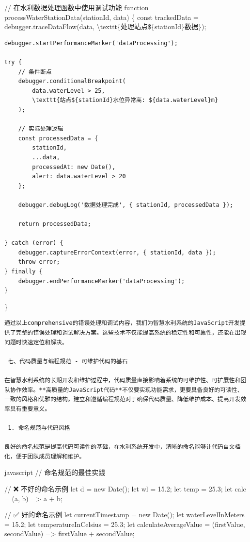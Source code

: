 {{// 在水利数据处理函数中使用调试功能 function processWaterStationData(stationId, data) \{ const trackedData = debugger.traceDataFlow(data, \textbackslash texttt\{处理站点\$\{stationId\}数据\});

\begin{verbatim}
debugger.startPerformanceMarker('dataProcessing');

try {
    // 条件断点
    debugger.conditionalBreakpoint(
        data.waterLevel > 25, 
        \texttt{站点${stationId}水位异常高: ${data.waterLevel}m}
    );
    
    // 实际处理逻辑
    const processedData = {
        stationId,
        ...data,
        processedAt: new Date(),
        alert: data.waterLevel > 20
    };
    
    debugger.debugLog('数据处理完成', { stationId, processedData });
    
    return processedData;
    
} catch (error) {
    debugger.captureErrorContext(error, { stationId, data });
    throw error;
} finally {
    debugger.endPerformanceMarker('dataProcessing');
}
\end{verbatim}

\}

\begin{lstlisting}
通过以上comprehensive的错误处理和调试内容，我们为智慧水利系统的JavaScript开发提供了完整的错误处理和调试解决方案。这些技术不仅能提高系统的稳定性和可靠性，还能在出现问题时快速定位和解决。

 七、代码质量与编程规范 - 可维护代码的基石

在智慧水利系统的长期开发和维护过程中，代码质量直接影响着系统的可维护性、可扩展性和团队协作效率。**高质量的JavaScript代码**不仅要实现功能需求，更要具备良好的可读性、一致的风格和优雅的结构。建立和遵循编程规范对于确保代码质量、降低维护成本、提高开发效率具有重要意义。

 1. 命名规范与代码风格

良好的命名规范是提高代码可读性的基础，在水利系统开发中，清晰的命名能够让代码自文档化，便于团队成员理解和维护。
\end{lstlisting}

javascript // 命名规范的最佳实践

// ❌ 不好的命名示例 let d = new Date(); let wl = 15.2; let temp = 25.3; let calc = (a, b) =\textgreater{} a + b;

// ✅ 好的命名示例 let currentTimestamp = new Date(); let waterLevelInMeters = 15.2; let temperatureInCelsius = 25.3; let calculateAverageValue = (firstValue, secondValue) =\textgreater{} firstValue + secondValue;

}}
